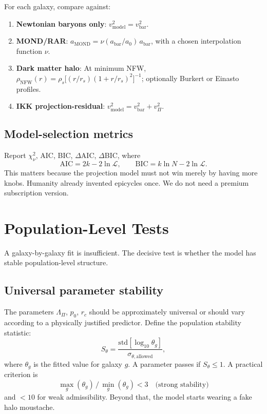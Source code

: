 \documentclass[11pt,a4paper,oneside]{article}
\newcommand{\abar}{a_{\mathrm{bar}}}
\newcommand{\aMOND}{a_{\mathrm{MOND}}}
\newcommand{\vbar}{v_{\mathrm{bar}}}
\newcommand{\vPi}{v_{\Pi}}
\newcommand{\vmod}{v_{\mathrm{model}}}
\newcommand{\LamPi}{\Lambda_{\Pi}}
\newcommand{\pzero}{p_0}
\newcommand{\rc}{r_c}
\newcommand{\rhoNFW}{\rho_{\mathrm{NFW}}}
\begin{document}
For each galaxy, compare against:
\begin{enumerate}
  \item \textbf{Newtonian baryons only}: $\vmod^2 = \vbar^2$.
  \item \textbf{MOND/RAR}: $\aMOND = \nu({\abar}/{a_0})\,\abar$, with a chosen
        interpolation function $\nu$.
  \item \textbf{Dark matter halo}: At minimum NFW,
        $\rhoNFW(r) = \rho_s\bigl[(r/r_s)(1+r/r_s)^2\bigr]^{-1}$;
        optionally Burkert or Einasto profiles.
  \item \textbf{IKK projection-residual}: $\vmod^2 = \vbar^2 + \vPi^2$.
\end{enumerate}

\subsection{Model-selection metrics}

Report $\chi^2_\nu$, AIC, BIC, $\Delta$AIC, $\Delta$BIC, where
\[
    \mathrm{AIC} = 2k - 2\ln\mathcal{L}, \qquad
    \mathrm{BIC} = k\ln N - 2\ln\mathcal{L}.
\]
This matters because the projection model must not win merely by having more knobs.
Humanity already invented epicycles once. We do not need a premium subscription version.

\section{Population-Level Tests}

A galaxy-by-galaxy fit is insufficient. The decisive test is whether the model has
stable population-level structure.

\subsection{Universal parameter stability}

The parameters $\LamPi$, $\pzero$, $\rc$ should be approximately universal or should
vary according to a physically justified predictor. Define the population stability
statistic:
\[
    S_\theta = \frac{\mathrm{std}[\log_{10}\theta_g]}
                    {\sigma_{\theta,\mathrm{allowed}}},
\]
where $\theta_g$ is the fitted value for galaxy $g$. A parameter passes if
$S_\theta \leq 1$. A practical criterion is
\[
    \max_g(\theta_g)\,/\,\min_g(\theta_g) < 3
    \quad\text{(strong stability)}
\]
and $< 10$ for weak admissibility. Beyond that, the model starts wearing a fake halo
moustache.
\end{document}
